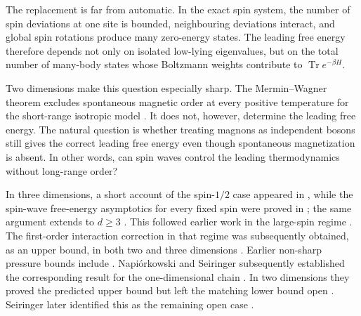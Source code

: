 \documentclass[11pt]{article}
\numberwithin{equation}{section}
\theoremstyle{remark}
\newcommand{\Tr}{\operatorname{Tr}}
\newcommand{\1}{\mathbf 1}
\begin{document}
The replacement is far from automatic.  In the exact spin system, the
number of spin deviations at one site is bounded, neighbouring deviations
interact, and global spin rotations produce many zero-energy states.  The
leading free energy therefore depends not only on isolated low-lying
eigenvalues, but on the total number of many-body states whose Boltzmann
weights contribute to \(\Tr e^{-\beta H}\).

Two dimensions make this question especially sharp.  The Mermin--Wagner
theorem excludes spontaneous magnetic order at every positive temperature
for the short-range isotropic model \cite{MerminWagner1966}.  It does not,
however, determine the leading free energy.  The natural question is
whether treating magnons as independent bosons still gives the correct
leading free energy even though spontaneous magnetization is absent.  In
other words, can spin waves control the leading thermodynamics without
long-range order?

In three dimensions, a short account of the spin-\(1/2\) case appeared in
\cite{CorreggiGiulianiSeiringer2014}, while the spin-wave free-energy
asymptotics for every fixed spin were proved in
\cite{CorreggiGiulianiSeiringer2015}; the same argument extends to
\(d\geq3\) \cite{SeiringerOberwolfach2025}.  This followed earlier work in the
large-spin regime \cite{CorreggiGiuliani2012}.  The first-order interaction
correction in that regime was subsequently obtained, as an upper bound, in
both two and three dimensions \cite{Benedikter2017}.  Earlier non-sharp
pressure bounds include \cite{ConlonSolovej1991,Toth1993}.  Napiórkowski and
Seiringer subsequently established the corresponding result for the
one-dimensional chain \cite{NapiorkowskiSeiringer2021}.  In two dimensions
they proved the predicted upper bound but left the matching lower bound
open \cite{NapiorkowskiSeiringer2021}.  Seiringer later identified this as
the remaining open case \cite{SeiringerOberwolfach2025}.
\end{document}
